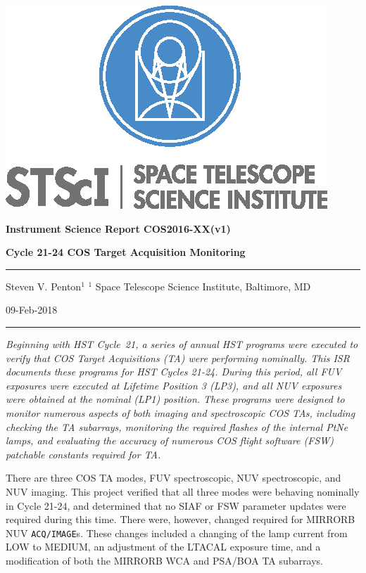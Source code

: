 \documentclass[12pt]{reportj}
\begin{document}
\vspace{-2.4cm}
\noindent\includegraphics*[width=0.295\linewidth]{eps/new_st_logo.eps}

\vspace{-0.4cm}

\begin{flushright}
{\bf Instrument Science Report COS2016-XX(v1)}

\vspace{1.1cm}

{\bf\Huge Cycle 21-24 COS Target Acquisition Monitoring}

\rule{0.25\linewidth}{0.5pt}

\vspace{0.5cm}
Steven V. Penton$^1$
\linebreak
\newline
\footnotesize{$^1$ Space Telescope Science Institute, Baltimore, MD}
\vspace{0.5cm}

09-Feb-2018
\end{flushright}

\vspace{0.1cm}
\noindent\rule{\linewidth}{1.0pt}

{\it \noindent
Beginning with HST Cycle~21, a series of annual HST programs were executed to verify that COS Target Acquisitions (TA) were performing
nominally.  This ISR documents these programs for HST Cycles 21-24. During this period, all FUV exposures were executed at Lifetime Position 3 (LP3),
and all NUV exposures were obtained at the nominal (LP1) position.
These programs were designed to monitor numerous aspects of both imaging and spectroscopic COS TAs, including
checking the TA subarrays, monitoring the required flashes of the internal PtNe lamps, and evaluating the accuracy of
numerous COS flight software (FSW) patchable constants required for TA.

There are three COS TA modes, FUV spectroscopic, NUV spectroscopic, and NUV imaging.
This project verified that all three modes were behaving nominally in Cycle 21-24, and determined that no SIAF or FSW parameter updates were required during this time.
There were, however, changed required for MIRRORB NUV \texttt{ACQ/IMAGE}s. These changes included a changing of the lamp current from LOW to MEDIUM, an adjustment of the LTACAL exposure time, and a modification of both the MIRRORB WCA and PSA/BOA TA subarrays. }
\end{document}
